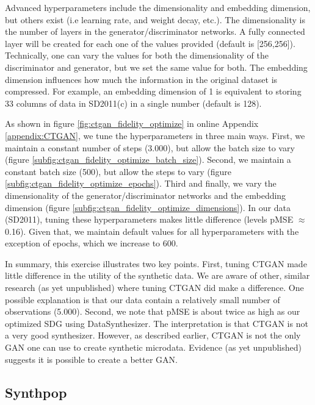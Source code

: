 \documentclass[runningheads]{llncs}
\begin{document}
Advanced hyperparameters include the dimensionality and embedding dimension, but others exist (i.e learning rate, and weight decay, etc.).  The dimensionality is the number of layers in the generator/discriminator networks.  A fully connected layer will be created for each one of the values provided (default is [256,256]).  Technically, one can vary the values for both the dimensionality of the discriminator and generator, but we set the same value for both.  The embedding dimension influences how much the information in the original dataset is compressed.  For example, an embedding dimension of 1 is equivalent to storing 33 columns of data in SD2011(c) in a single number (default is 128).

As shown in figure \ref{fig:ctgan_fidelity_optimize} in online Appendix \ref{appendix:CTGAN}, we tune the hyperparameters in three main ways.  First, we maintain a constant number of steps (3.000), but allow the batch size to vary (figure \ref{subfig:ctgan_fidelity_optimize_batch_size}).  Second, we maintain a constant batch size (500), but allow the steps to vary (figure \ref{subfig:ctgan_fidelity_optimize_epochs}).  Third and finally, we vary the dimensionality of the generator/discriminator networks and the embedding dimension (figure \ref{subfig:ctgan_fidelity_optimize_dimensions}).  In our data (SD2011), tuning these hyperparameters makes little difference (levels pMSE $\approx$ 0.16).  Given that, we maintain default values for all hyperparameters with the exception of epochs, which we increase to 600.

In summary, this exercise illustrates two key points.  First, tuning CTGAN made little difference in the utility of the synthetic data.  We are aware of other, similar research (as yet unpublished) where tuning CTGAN did make a difference.  One possible explanation is that our data contain a relatively small number of observations (5.000).  Second, we note that pMSE is about twice as high as our optimized SDG using DataSynthesizer.  The interpretation is that CTGAN is not a very good synthesizer.  However, as described earlier, CTGAN is not the only GAN one can use to create synthetic microdata.  Evidence (as yet unpublished) suggests it is possible to create a better GAN.

\subsection{Synthpop} 
\end{document}
